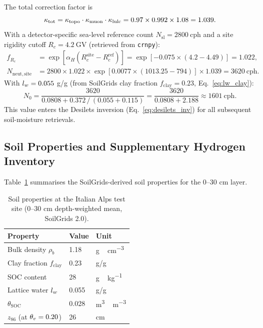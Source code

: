 The total correction factor is
\begin{equation*}
  \kappa_\mathrm{tot} = \kappa_\mathrm{topo} \cdot \kappa_\mathrm{muon} \cdot \kappa_\mathrm{lulc}
        = 0.97 \times 0.992 \times 1.08
        = 1.039.
\end{equation*}
With a detector-specific sea-level reference count
$N_\mathrm{sl} = \SI{2800}{\text{cph}}$ and a site rigidity
cutoff $R_c = \SI{4.2}{\giga\volt}$ (retrieved from \texttt{crnpy}):
\begin{align*}
  f_{R_c} &= \exp[\alpha_H (R_c^\mathrm{site} - R_c^\mathrm{ref})]
           = \exp[-0.075 \times (4.2 - 4.49)] = 1.022, \\
  N_\mathrm{neut,site} &= 2800 \times 1.022
    \times \exp[0.0077 \times (1013.25 - 794)] \times 1.039
    = \SI{3620}{\text{cph}}.
\end{align*}
With $l_w = 0.055$ g/g (from SoilGrids clay fraction
$f_\mathrm{clay} = 0.23$, Eq.~\eqref{eq:lw_clay}):
\begin{equation*}
  N_0 = \frac{3620}{0.0808 + 0.372\,/\,(0.055 + 0.115)}
      = \frac{3620}{0.0808 + 2.188}
      \approx \SI{1601}{\text{cph}}.
\end{equation*}
This value enters the Desilets inversion
(Eq.~\eqref{eq:desilets_inv}) for all subsequent soil-moisture
retrievals.

\subsection{Soil Properties and Supplementary Hydrogen Inventory}

Table~\ref{tab:soilprops} summarises the SoilGrids-derived soil
properties for the 0–30 cm layer.

\begin{table}[h]
\centering
\caption{Soil properties at the Italian Alps test site (0–30 cm
depth-weighted mean, SoilGrids 2.0).}
\label{tab:soilprops}
\begin{tabular}{lll}
\toprule
Property & Value & Unit \\
\midrule
Bulk density $\rho_b$          & 1.18  & \si{g\,cm^{-3}} \\
Clay fraction $f_\mathrm{clay}$ & 0.23  & g/g \\
SOC content                    & 28    & \si{g\,kg^{-1}} \\
Lattice water $l_w$            & 0.055 & g/g \\
$\theta_\mathrm{SOC}$          & 0.028 & \si{m^3\,m^{-3}} \\
$z_{86}$ (at $\theta_v = 0.20$) & 26    & cm \\
\bottomrule
\end{tabular}
\end{table}

